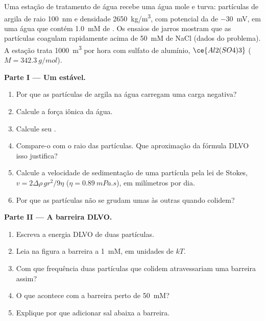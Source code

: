 \begin{problem}
\label{pb:b3:colloids:1}
Uma estação de tratamento de água recebe uma água mole e turva: partículas de argila de
raio \qty{100}{nm} e densidade \qty{2650}{kg/m^3}, com potencial da  de \qty{-30}{mV}, em
uma água que contém \qty{1.0}{mM} de . Os ensaios de jarros mostram que as partículas
coagulam rapidamente acima de \qty{50}{mM} de NaCl (dados do problema). A estação trata \qty{1000}{m^3}
por hora com sulfato de alumínio, $\ce{Al2(SO4)3}$ ($M = \qty{342.3}{g/mol}$).

\medskip\noindent\textbf{Parte I --- Um  estável.}
\begin{enumerate}
  \item Por que as partículas de argila na água carregam uma carga negativa?
  \item Calcule a força iônica da água.
  \item Calcule seu .
  \item Compare-o com o raio das partículas. Que aproximação da fórmula DLVO isso
        justifica?
  \item Calcule a velocidade de sedimentação de uma partícula pela lei de Stokes, $v =
        2\Delta\rho\,gr^2/9\eta$ ($\eta = \qty{0.89}{mPa.s}$), em milímetros por dia.
  \item Por que as partículas não se grudam umas às outras quando colidem?
\end{enumerate}

\medskip\noindent\textbf{Parte II --- A barreira DLVO.}
\begin{enumerate}[resume]
  \item Escreva a energia DLVO de duas partículas.
  \item Leia na figura a barreira a \qty{1}{mM}, em unidades de $kT$.
  \item Com que frequência duas partículas que colidem atravessariam uma barreira assim?
  \item O que acontece com a barreira perto de \qty{50}{mM}?
  \item Explique por que adicionar sal abaixa a barreira.
\end{enumerate}


\end{problem}
